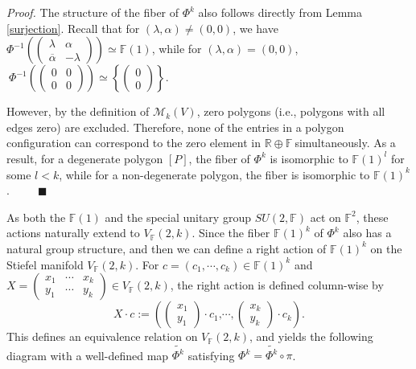 \documentclass[a4paper]{article}%
\newenvironment{proof}[1][Proof]{\noindent\textit{#1.} }{}
\begin{document}
\begin{proof}
The structure of the fiber of $\Phi^{k}$ also follows directly from Lemma
\ref{surjection}. Recall that for $(\lambda,\alpha)\neq(0,0)$, we have
$\Phi^{-1}\left(
\begin{pmatrix}
\lambda & \alpha\\
\overline{\alpha} & -\lambda
\end{pmatrix}
\right)  \simeq\mathbb{F}(1)$, while for $(\lambda,\alpha)=(0,0)$,$\ \Phi
^{-1}\left(
\begin{pmatrix}
0 & 0\\
0 & 0
\end{pmatrix}
\right)  \simeq\left\{
\begin{pmatrix}
0\\
0
\end{pmatrix}
\right\}  $.

However, by the definition of $\mathcal{M}_{k}(V)$, zero polygons (i.e.,
polygons with all edges zero) are excluded. Therefore, none of the entries in
a polygon configuration can correspond to the zero element in $\mathbb{R}%
\oplus\mathbb{F\ }$simultaneously. As a result, for a degenerate polygon
$[P]$, the fiber of $\Phi^{k}$ is isomorphic to $\mathbb{F}(1)^{l}$ for some
$l<k$, while for a non-degenerate polygon, the fiber is isomorphic to
$\mathbb{F}(1)^{k}$.\ \ \ \ \ $\blacksquare$
\end{proof}

As both the $\mathbb{F}(1)$ and the special unitary group $SU(2,\mathbb{F})$
act on $\mathbb{F}^{2}$, these actions naturally extend to $V_{\mathbb{F}%
}(2,k)$. Since the fiber $\mathbb{F}(1)^{k}$ of $\Phi^{k}$ also has a natural
group structure, and then we can define a right action of $\mathbb{F}(1)^{k}$
on the Stiefel manifold $V_{\mathbb{F}}(2,k)$. For $c=(c_{1},\cdots,c_{k}%
)\in\mathbb{F}(1)^{k}$ and $X=%
\begin{pmatrix}
x_{1} & \cdots & x_{k}\\
y_{1} & \cdots & y_{k}%
\end{pmatrix}
\in V_{\mathbb{F}}(2,k)$, the right action is defined column-wise by\quad\
\[
X\cdot c:=\left(
\begin{pmatrix}
x_{1}\\
y_{1}%
\end{pmatrix}
\cdot c_{1}\text{,}\cdots,%
\begin{pmatrix}
x_{k}\\
y_{k}%
\end{pmatrix}
\cdot c_{k}\right)  .
\]
This defines an equivalence relation on $V_{\mathbb{F}}(2,k)$, and yields the
following diagram with a well-defined map $\widetilde{\Phi^{k}}$ satisfying
$\Phi^{k}=\widetilde{\Phi^{k}}\circ\pi$.%
\end{document}
